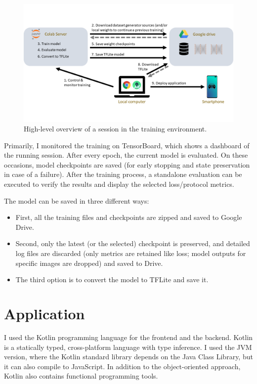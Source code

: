 \begin{figure}[htb]
 \centerline{\includegraphics[width=1.0\columnwidth]{.//Figure/Technologies/training_environment.png}}
 \caption{High-level overview of a session in the training environment.}
 \label{fig:training_environment}
\end{figure}

Primarily, I monitored the training on TensorBoard, which shows a dashboard of the running session. After every epoch, the current model is evaluated. On these occasions, model checkpoints are saved (for early stopping and state preservation in case of a failure). After the training process, a standalone evaluation can be executed to verify the results and display the selected loss/protocol metrics.

The model can be saved in three different ways:

\begin{itemize}
  \item First, all the training files and checkpoints are zipped and saved to Google Drive.
  \item Second, only the latest (or the selected) checkpoint is preserved, and detailed log files are discarded (only metrics are retained like loss; model outputs for specific images are dropped) and saved to Drive.
  \item The third option is to convert the model to TFLite and save it.
\end{itemize}

\pagebreak
\section{Application}

I used the Kotlin programming language\cite{Kotlin} for the frontend and the backend. Kotlin is a statically typed, cross-platform language with type inference. I used the JVM version, where the Kotlin standard library depends on the Java Class Library, but it can also compile to JavaScript. In addition to the object-oriented approach, Kotlin also contains functional programming tools.

